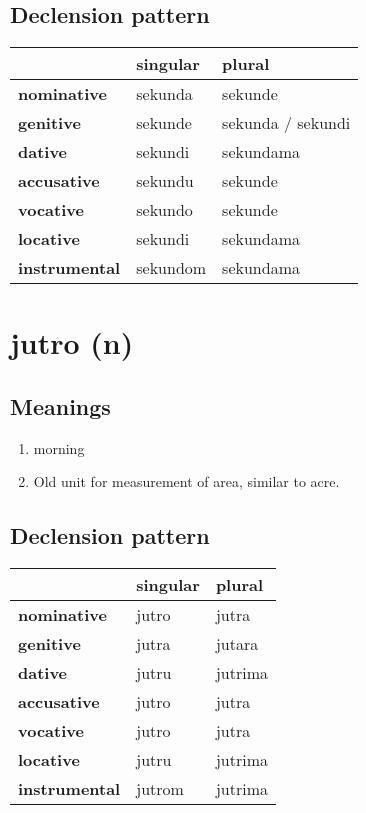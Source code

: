\subsection*{Declension pattern}
\begin{tabularx}{\linewidth}{Xll}
\toprule
{} &  singular &             plural \\
\midrule
\textbf{nominative  } &   sekunda &            sekunde \\
\textbf{genitive    } &   sekunde &  sekunda / sekundi \\
\textbf{dative      } &   sekundi &          sekundama \\
\textbf{accusative  } &   sekundu &            sekunde \\
\textbf{vocative    } &   sekundo &            sekunde \\
\textbf{locative    } &   sekundi &          sekundama \\
\textbf{instrumental} &  sekundom &          sekundama \\
\bottomrule
\end{tabularx}

\filbreak
\section{jutro (n)}
\subsection*{Meanings}
\begin{enumerate}
\item morning
\item Old unit for measurement of area, similar to acre.
\end{enumerate}
\subsection*{Declension pattern}
\begin{tabularx}{\linewidth}{Xll}
\toprule
{} & singular &   plural \\
\midrule
\textbf{nominative  } &    jutro &    jutra \\
\textbf{genitive    } &    jutra &   jutara \\
\textbf{dative      } &    jutru &  jutrima \\
\textbf{accusative  } &    jutro &    jutra \\
\textbf{vocative    } &    jutro &    jutra \\
\textbf{locative    } &    jutru &  jutrima \\
\textbf{instrumental} &   jutrom &  jutrima \\
\bottomrule
\end{tabularx}

